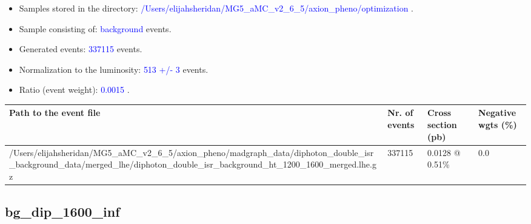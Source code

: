 \documentclass[a4paper, 10pt]{article}
\begin{document}
\begin{itemize}
  \item Samples stored in the directory: \textcolor{blue}{/\-Users/\-elijahsheridan/\-MG5\_aMC\_v2\_6\_5/\-axion\_pheno/\-optimization} .
   \item Sample consisting of: \textcolor{blue}{background}  events.
   \item Generated events: \textcolor{blue}{337115 }  events.
   \item Normalization to the luminosity: \textcolor{blue}{513}\textcolor{blue}{ +/\-- }\textcolor{blue}{3 }  events.
   \item Ratio (event weight): \textcolor{blue}{0.0015 } .  
 
\end{itemize}
\begin{table}[H]
  \begin{center}
    \begin{tabular}{|m{55.0mm}|m{25.0mm}|m{30.0mm}|m{30.0mm}|}
      \hline
      {\cellcolor{yellow}         Path to the event file}& {\cellcolor{yellow}         Nr. of events}& {\cellcolor{yellow}         Cross section (pb)}& {\cellcolor{yellow}         Negative wgts (\%)}\\
      \hline
      {\cellcolor{white}          /\-Users/\-elijahsheridan/\-MG5\_aMC\_v2\_6\_5/\-axion\_pheno/\-madgraph\_data/\-diphoton\_double\_isr\_background\_data/\-merged\_lhe/\-diphoton\_double\_isr\_background\_ht\_1200\_1600\_merged.lhe.gz}& {\cellcolor{white}          337115}& {\cellcolor{white}          0.0128 @ 0.51\%}& {\cellcolor{white}          0.0}\\
\hline
    \end{tabular}
  \end{center}
\end{table}

\subsection{ bg\_dip\_1600\_inf}
\end{document}
